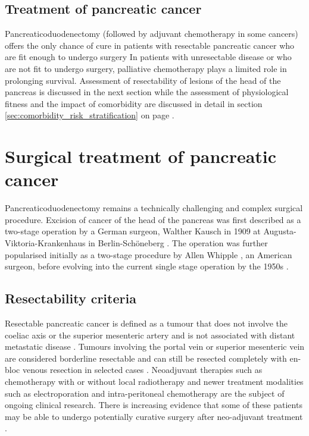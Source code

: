 \subsection{Treatment of pancreatic cancer}
Pancreaticoduodenectomy (followed by adjuvant chemotherapy in some cancers) offers the only chance of cure in patients with resectable pancreatic cancer who are fit enough to undergo surgery \parencite{li_pancreatic_2004}
In patients with unresectable disease or who are not fit to undergo surgery, palliative chemotherapy plays a limited role in prolonging survival. 
Assessment of resectability of lesions of the head of the pancreas is discussed in the next section while the assessment of physiological fitness and the impact of comorbidity are discussed in detail in section \ref{sec:comorbidity_risk_stratification} on page \pageref{sec:comorbidity_risk_stratification}.

\section{Surgical treatment of pancreatic cancer}
Pancreaticoduodenectomy remains a technically challenging and complex surgical procedure. 
Excision of cancer of the head of the pancreas was first described as a two-stage operation by a German surgeon, Walther Kausch in 1909 at Augusta-Viktoria-Krankenhaus in Berlin-Schöneberg \parencite{kausch_carcinom_1912}. 
The operation was further popularised initially as a two-stage procedure by Allen Whipple \parencite{whipple_treatment_1935}, an American surgeon, before evolving into the current single stage operation by the 1950s \parencite{whipple_rationale_1941, whipple_radical_1950}.

\subsection{Resectability criteria}
\label{sec:resectability_criteria}
Resectable pancreatic cancer is defined as a tumour that does not involve the coeliac axis or the superior mesenteric artery and is not associated with distant metastatic disease \parencite{li_pancreatic_2004}. 
Tumours involving the portal vein or superior mesenteric vein are considered borderline resectable and can still be resected completely with en-bloc venous resection in selected cases \parencite{fuhrman_rationale_1996}. 
Neoadjuvant therapies such as chemotherapy with or without local radiotherapy \parencite{gillen_preoperative/neoadjuvant_2010, evans_preoperative_2008} and newer treatment modalities such as electroporation \parencite{bower_irreversible_2011} and intra-peritoneal chemotherapy \parencite{kamath_rationale_2009} are the subject of ongoing clinical research.
There is increasing evidence that some of these patients may be able to undergo potentially curative surgery after neo-adjuvant treatment \parencite{gillen_preoperative/neoadjuvant_2010}.

